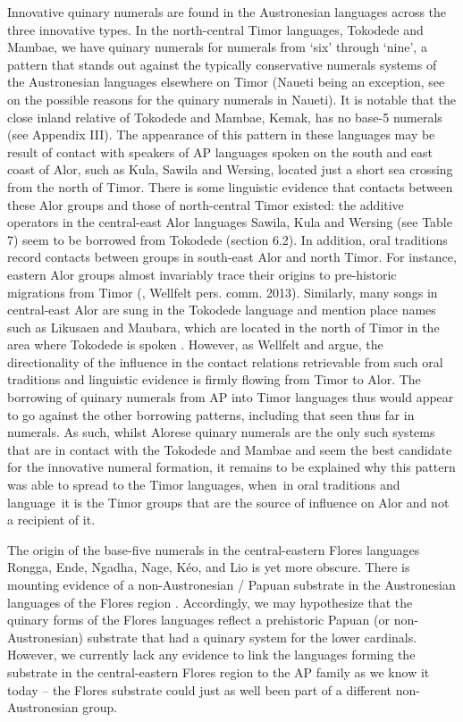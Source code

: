 {    Innovative quinary numerals are found in the Austronesian languages across the three innovative types. In the north-central Timor languages, Tokodede and Mambae, we have quinary numerals for numerals from `six' through `nine', a pattern that stands out against the typically conservative numerals systems of the Austronesian languages elsewhere on Timor (Naueti being an exception, see \citet{SchapperEtAl2013} on the possible reasons for the quinary numerals in Naueti). It is notable that the close inland relative of Tokodede and Mambae, Kemak, has no base-5 numerals (see Appendix III). The appearance of this pattern in these languages may be result of contact with speakers of AP languages spoken on the south and east coast of Alor, such as Kula, Sawila and Wersing, located just a short sea crossing from the north of Timor. There is some linguistic evidence that contacts between these Alor groups and those of north-central Timor existed: the additive operators in the central-east Alor languages Sawila, Kula and Wersing (see Table 7) seem to be borrowed from Tokodede (section 6.2). In addition, oral traditions record contacts between groups in south-east Alor and north Timor. For instance, eastern Alor groups almost invariably trace their origins to pre-historic migrations from Timor (\citet{WellfeltEtAl2013}, Wellfelt pers. comm. 2013). Similarly, many songs in central-east Alor are sung in the Tokodede language and mention place names such as Likusaen and Maubara, which are located in the north of Timor in the area where Tokodede is spoken \citep{WellfeltEtAl2013}. However, as Wellfelt and \citet{Schapper2013} argue, the directionality of the influence in the contact relations retrievable from such oral traditions and linguistic evidence is firmly flowing from Timor to Alor. The borrowing of quinary numerals from AP into Timor languages thus would appear to go against the other borrowing patterns, including that seen thus far in numerals. As such, whilst Alorese quinary numerals are the only such systems that are in contact with the Tokodede and Mambae and seem the best candidate for the innovative numeral formation, it remains to be explained why this pattern was able to spread to the Timor languages, when~in oral traditions and language~it is the Timor groups that are the source of influence on Alor and not a recipient of it.

The origin of the base-five numerals in the central-eastern Flores languages Rongga, Ende, Ngadha, Nage, K\'eo, and Lio is yet more obscure. There is mounting evidence of a non-Austronesian / Papuan substrate in the Austronesian languages of the Flores region \citep[see, e.g.,][]{Capell1976,Klamer2012}. Accordingly, we may hypothesize that the quinary forms of the Flores languages reflect a prehistoric Papuan (or non-Austronesian) substrate that had a quinary system for the lower cardinals. However, we currently lack any evidence to link the languages forming the substrate in the central-eastern Flores region to the AP family as we know it today -- the Flores substrate could just as well been part of a different non-Austronesian group.

}
